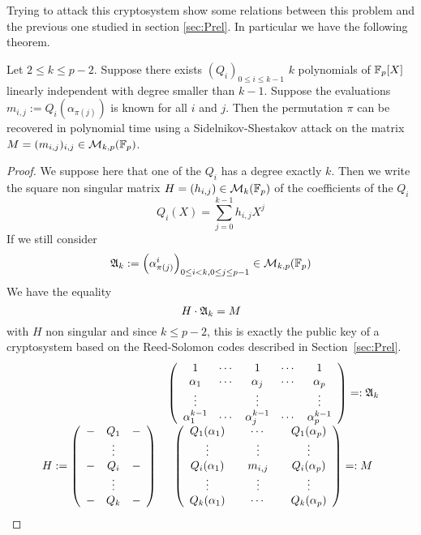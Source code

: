 \documentclass[12pt,a4paper,titlepage]{article}
\newcommand{\GF}[1]{\F_{#1}}
\begin{document}
Trying to attack this cryptosystem show some relations between this problem and the previous one studied in section \ref{sec:Prel}. In particular we have the following theorem.

\begin{theorem}
\label{thm:link}
Let $2 \leq k \leq p-2$.
Suppose there exists $(Q_i)_{0 \leq i \leq k-1}$ $k$ polynomials of $\GF{p}[X]$ linearly independent with degree smaller than $k-1$.
Suppose the evaluations $m_{i,j} := Q_i(\alpha_{\pi(j)})$ is known for all $i$ and $j$.
Then the permutation $\pi$ can be recovered in polynomial time using a Sidelnikov-Shestakov attack on the matrix $M = (m_{i,j})_{i,j} \in \mathcal{M}_{k,p}(\GF{p})$.
\end{theorem}
\begin{proof}
We suppose here that one of the $Q_i$ has a degree exactly $k$.
Then we write the square non singular matrix $H = (h_{i,j}) \in \mathcal{M}_k(\GF{p})$ of the coefficients of the $Q_i$
$$ Q_i(X) = \sum_{j=0}^{k-1} h_{i,j} X^j $$
If we still consider
$$ \A_k := \left( \alpha_{\pi(j)}^i \right)_{0 \leq i < k, 0 \leq j \leq p-1} \in \mathcal{M}_{k,p}(\GF{p})$$
We have the equality
$$ H \cdot \mathfrak{A}_k = M$$
with $H$ non singular and since $k \leq p-2$, this is exactly the public key of a cryptosystem based on the Reed-Solomon codes described in Section~\ref{sec:Prel}.
$$
\begin{array}{ccl}
& \left( \begin{array}{ccccc}
1&\cdots&1&\cdots&1\\
\alpha_1&\cdots&\alpha_j&\cdots&\alpha_p\\
\vdots&&\vdots&&\vdots \\
\alpha_1^{k-1}&\cdots&\alpha_j^{k-1}&\cdots&\alpha_p^{k-1}
\end{array} \right) =: \mathfrak{A}_k \\
H := \left( \begin{array}{ccc}
-&Q_1&-  \\
&\vdots& \\
-&Q_i&-  \\
&\vdots& \\
-&Q_k&-
\end{array} \right) &
\left( \begin{array}{ccccc}
Q_1(\alpha_1)&&\cdots&&Q_1(\alpha_p)\\
\vdots&&\vdots&&\vdots \\
Q_i(\alpha_1)&&m_{i,j}&&Q_i(\alpha_p)\\
\vdots&&\vdots&&\vdots \\
Q_k(\alpha_1)&&\cdots&&Q_k(\alpha_p)
\end{array} \right) =: M \\
\end{array}
$$
\end{proof}
\end{document}

